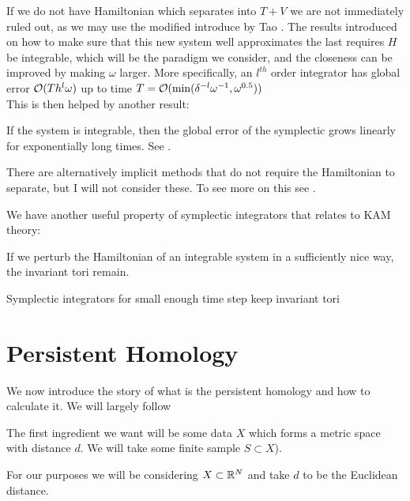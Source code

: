 \documentclass{article}
\begin{document}
\begin{remark}
	If we do not have Hamiltonian which separates into $T+V$ we are not immediately ruled out, as we may use the modified 
introduce by Tao \cite{Tao2016}. The results introduced on how to make sure that this new system well approximates the last requires $H$ be integrable, which will be the paradigm we consider, and the closeness can be improved by making $\omega$ larger. More specifically, an $l^{th}$ order integrator has global error $\mathcal{O}(Th^l\omega)$ up to time $T = \mathcal{O}(\min(\delta^{-l}\omega^{-1},\omega^{0.5}))$\\
This is then helped by another result:
\begin{lemma}
	If the system is integrable, then the global error of the symplectic grows linearly for exponentially long times. See \cite{Stoffer1998}.
\end{lemma}
There are alternatively implicit methods that do not require the Hamiltonian to separate, but I will not consider these. To see more on this see \cite{Yoshida1993}.
\end{remark} 

We have another useful property of symplectic integrators that relates to KAM theory:

\begin{theorem}
	If we perturb the Hamiltonian of an integrable system in a sufficiently nice way, the invariant tori remain. 
\end{theorem}

\begin{theorem}
	Symplectic integrators for small enough time step keep invariant tori
\end{theorem}

\section{Persistent Homology}
We now introduce the story of what is the persistent homology and how to calculate it. We will largely follow \cite{Otter2017}

The first ingredient we want will be some data $X$ which forms a metric space with distance $d$. We will take some finite sample $S \subset X$). 

\begin{remark}
	For our purposes we will be considering $X \subset \mathbb{R}^N$ and take $d$ to be the Euclidean distance. 
\end{remark}
\end{document}
